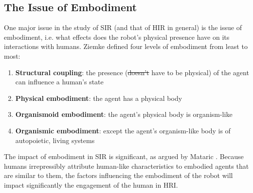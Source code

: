 \documentclass{ut-thesis}
\providecommand{\DIFaddtex}[1]{{\protect\color{blue}\uwave{#1}}} %
\providecommand{\DIFdeltex}[1]{{\protect\color{red}\sout{#1}}}                      %
\providecommand{\DIFaddbegin}{} %
\providecommand{\DIFaddend}{} %
\providecommand{\DIFdelbegin}{} %
\providecommand{\DIFdelend}{} %
\providecommand{\DIFadd}[1]{\texorpdfstring{\DIFaddtex{#1}}{#1}} %
\providecommand{\DIFdel}[1]{\texorpdfstring{\DIFdeltex{#1}}{}} %
\begin{document}
\subsection{The Issue of Embodiment}
One major issue in the study of SIR (and that of HIR in general) is the issue of embodiment, i.e. what effects does the robot's physical presence have on its interactions with humans.  Ziemke \cite{ziemke2001disentangling} defined four levels of embodiment from least to most:
\begin{enumerate}
	\item \textbf{Structural coupling}: the presence (\DIFdelbegin \DIFdel{doesn't }\DIFdelend \DIFaddbegin \DIFadd{does not }\DIFaddend have to be physical) of the agent can influence a human's state
	\item \textbf{Physical embodiment}: the agent has a physical body
	\item \textbf{Organismoid embodiment}: the agent's physical body is organism-like
	\item \textbf{Organismic embodiment}: except the agent's organism-like body is of autopoietic, living systems
\end{enumerate}


The impact of embodiment in SIR is significant, as argued by Mataric \cite{mataric2005role}.  Because humans irrepressibly attribute human-like characteristics to embodied agents that are similar to them, the factors influencing the embodiment of the robot will impact significantly the engagement of the human in HRI.
\end{document}
